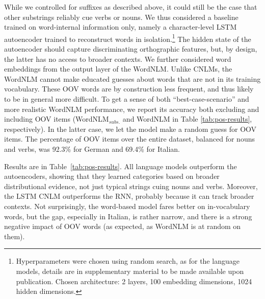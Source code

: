While we controlled for suffixes as described above, it could still be
the case that other substrings reliably cue verbs or nouns. We thus
considered a baseline trained on word-internal information only,
namely a character-level LSTM autoencoder trained to reconstruct words
in isolation.\footnote{Hyperparameters were chosen using random search, as for the language models, details are in supplementary material to be made available upon publication. Chosen architecture: 2 layers, 100 embedding dimensions, 1024 hidden dimensions.}
The hidden state of the autoencoder should capture
discriminating orthographic features, but, by design, the latter has
no access to broader contexts.  We further considered word embeddings
from the output layer of the WordNLM. Unlike CNLMs, the WordNLM cannot
make educated guesses about words that are not in its training
vocabulary. These OOV words are by construction less frequent, and
thus likely to be in general more difficult. To get a sense of both
``best-case-scenario'' and more realistic WordNLM performance, we
report its accuracy both excluding and including OOV items
(WordNLM$_{\textit{subs.}}$ and WordNLM in Table
\ref{tab:pos-results}, respectively). In the latter case, we let the
model make a random guess for OOV items.  The percentage of OOV items
over the entire dataset, balanced for nouns and verbs, was 92.3\% for
German and 69.4\% for Italian.

Results are in Table~\ref{tab:pos-results}.  All language models
outperform the autoencoders, showing that they learned categories
based on broader distributional evidence, not just typical strings
cuing nouns and verbs. Moreover, the LSTM CNLM outperforms the RNN,
probably because it can track broader contexts. Not surprisingly, the
word-based model fares better on in-vocabulary words, but the gap,
especially in Italian, is rather narrow, and there is a strong
negative impact of OOV
words (as expected, as WordNLM is at random on them). %

